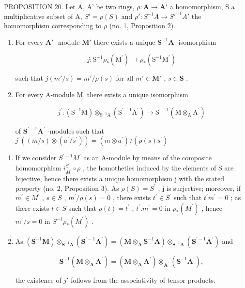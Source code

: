 PROPOSITION 20. Let A, A' be two rings, \(\rho: \mathbf{A} \to \mathbf{A}'\) a homomorphism, S a multiplicative subset of A, \(S' = \rho(S)\) and \(\rho': S^{-1}A \to S'^{-1}A'\) the homomorphism corresponding to \(\rho\) (no. 1, Proposition 2).

\begin{enumerate}
\def\labelenumi{(\roman{enumi})}
\tightlist
\item
  For every \(\mathbf{A}'\) -module \(\mathbf{M}'\) there exists a unique \(\mathbf{S}^{-1}\mathbf{A}\) -isomorphism

\[
j \colon \mathrm{S} ^ {- 1} \rho_ {*} (\mathrm{M} ^ {\prime}) \rightarrow \rho_ {*} ^ {\prime} (\mathrm{S} ^ {- 1} \mathrm{M} ^ {\prime})
\]

such that \(j(m' / s) = m' / \rho(s)\) for all \(m' \in \mathbf{M}'\) , \(s \in \mathbf{S}\) .

\item
  For every A-module M, there exists a unique isomorphism

\[
j ^ {\prime} \colon (\mathrm{S} ^ {- 1} \mathrm{M}) \otimes_ {\mathrm{S} ^ {- 1} \mathrm{A}} (\mathrm{S} ^ {\prime - 1} \mathrm{A} ^ {\prime}) \rightarrow \mathrm{S} ^ {\prime - 1} (\mathrm{M} \otimes_ {\mathrm{A}} \mathrm{A} ^ {\prime})
\]

of \(\mathbf{S}^{\prime -1}\mathbf{A}^{\prime}\) -modules such that \(j^{\prime}((m / s)\otimes (a^{\prime} / s^{\prime})) = (m\otimes a^{\prime}) / (\rho (s)s^{\prime})\)

\end{enumerate}
\begin{enumerate}
\def\labelenumi{(\roman{enumi})}
\item
  If we consider \(S^{\prime-1}M^{\prime}\) as an A-module by means of the composite homomorphism \(i_{M^{\prime}}^{S^{\prime}}\circ\rho\) , the homotheties induced by the elements of S are bijective, hence there exists a unique homomorphism j with the stated property (no. 2, Proposition 3). As \(\rho(S)=S^{\prime}\) , j is surjective; moreover, if \(m^{\prime}\in M^{\prime}\) , \(s\in S\) , \(m^{\prime}/\rho(s)=0\) , there exists \(t^{\prime}\in S^{\prime}\) such that \(t^{\prime}m^{\prime}=0\) ; as there exists \(t\in S\) such that \(\rho(t)=t^{\prime}\) , \(t^{\prime}.m^{\prime}=0\) in \(\rho_{*}(M^{\prime})\) , hence \(m^{\prime}/s=0\) in \(S^{-1}\rho_{*}(M^{\prime})\) .
\item
  As \((\mathbf{S}^{-1}\mathbf{M})\otimes_{\mathbf{S}^{-1}\mathbf{A}}(\mathbf{S}^{\prime -1}\mathbf{A}^{\prime}) = (\mathbf{M}\otimes_{\mathbf{A}}\mathbf{S}^{-1}\mathbf{A})\otimes_{\mathbf{S}^{-1}\mathbf{A}}(\mathbf{S}^{\prime -1}\mathbf{A}^{\prime})\) and

\[
\mathbf {S} ^ {- 1} (\mathbf {M} \otimes_ {\mathbf {A}} \mathbf {A} ^ {\prime}) = (\mathbf {M} \otimes_ {\mathbf {A}} \mathbf {A} ^ {\prime}) \otimes_ {\mathbf {A} ^ {\prime}} (\mathbf {S} ^ {- 1} \mathbf {A} ^ {\prime}),
\]

the existence of \(j'\) follows from the associativity of tensor products.

\end{enumerate}
